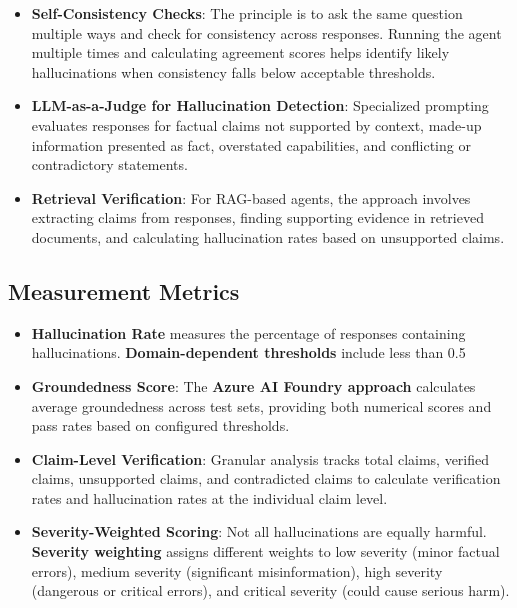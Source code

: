\begin{TNtwocol}
\begin{itemize}
\item{\textbf{Self-Consistency Checks}}: The principle is to ask the same question multiple ways and check for consistency across responses. Running the agent multiple times and calculating agreement scores helps identify likely hallucinations when consistency falls below acceptable thresholds.

\item{\textbf{LLM-as-a-Judge for Hallucination Detection}}: Specialized prompting evaluates responses for factual claims not supported by context, made-up information presented as fact, overstated capabilities, and conflicting or contradictory statements.

\item{\textbf{Retrieval Verification}}: For RAG-based agents, the approach involves extracting claims from responses, finding supporting evidence in retrieved documents, and calculating hallucination rates based on unsupported claims.
\end{itemize}

\subsection*{Measurement Metrics}
\begin{itemize}

\item{\textbf{Hallucination Rate}} measures the percentage of responses containing hallucinations. \textbf{Domain-dependent thresholds} include less than 0.5%

\item{\textbf{Groundedness Score}}: The \textbf{Azure AI Foundry approach} calculates average groundedness across test sets, providing both numerical scores and pass rates based on configured thresholds.

\item{\textbf{Claim-Level Verification}}: Granular analysis tracks total claims, verified claims, unsupported claims, and contradicted claims to calculate verification rates and hallucination rates at the individual claim level.

\item{\textbf{Severity-Weighted Scoring}}: Not all hallucinations are equally harmful. \textbf{Severity weighting} assigns different weights to low severity (minor factual errors), medium severity (significant misinformation), high severity (dangerous or critical errors), and critical severity (could cause serious harm).
\end{itemize}


\end{TNtwocol}
